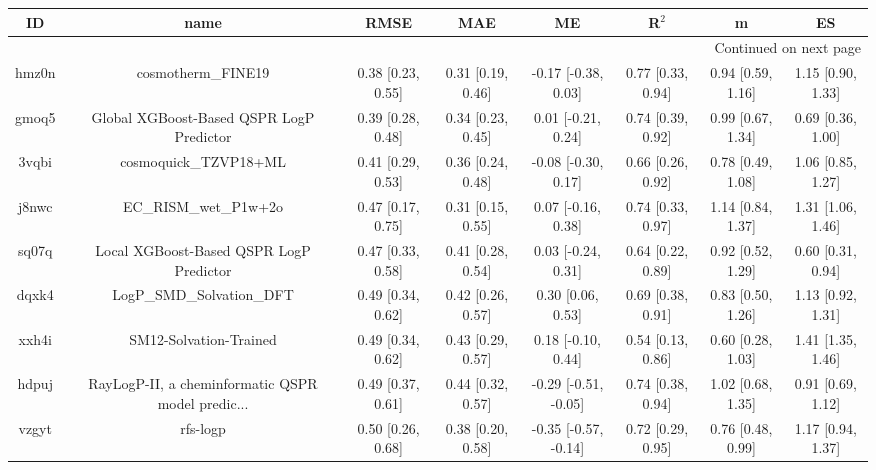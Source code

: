\documentclass{article}
\begin{document}
\begin{center}
\begin{longtable}{|cccccccc|}
\toprule
    ID &                                               name &               RMSE &                MAE &                    ME &              R$^2$ &                    m &                    ES \\
\midrule
\endhead
\midrule
\multicolumn{8}{r}{{Continued on next page}} \\
\midrule
\endfoot

\bottomrule
\endlastfoot
 hmz0n &                                 cosmotherm\_FINE19 &  0.38 [0.23, 0.55] &  0.31 [0.19, 0.46] &   -0.17 [-0.38, 0.03] &  0.77 [0.33, 0.94] &    0.94 [0.59, 1.16] &     1.15 [0.90, 1.33] \\
 gmoq5 &           Global XGBoost-Based QSPR LogP Predictor &  0.39 [0.28, 0.48] &  0.34 [0.23, 0.45] &    0.01 [-0.21, 0.24] &  0.74 [0.39, 0.92] &    0.99 [0.67, 1.34] &     0.69 [0.36, 1.00] \\
 3vqbi &                              cosmoquick\_TZVP18+ML &  0.41 [0.29, 0.53] &  0.36 [0.24, 0.48] &   -0.08 [-0.30, 0.17] &  0.66 [0.26, 0.92] &    0.78 [0.49, 1.08] &     1.06 [0.85, 1.27] \\
 j8nwc &                              EC\_RISM\_wet\_P1w+2o &  0.47 [0.17, 0.75] &  0.31 [0.15, 0.55] &    0.07 [-0.16, 0.38] &  0.74 [0.33, 0.97] &    1.14 [0.84, 1.37] &     1.31 [1.06, 1.46] \\
 sq07q &            Local XGBoost-Based QSPR LogP Predictor &  0.47 [0.33, 0.58] &  0.41 [0.28, 0.54] &    0.03 [-0.24, 0.31] &  0.64 [0.22, 0.89] &    0.92 [0.52, 1.29] &     0.60 [0.31, 0.94] \\
 dqxk4 &                          LogP\_SMD\_Solvation\_DFT &  0.49 [0.34, 0.62] &  0.42 [0.26, 0.57] &     0.30 [0.06, 0.53] &  0.69 [0.38, 0.91] &    0.83 [0.50, 1.26] &     1.13 [0.92, 1.31] \\
 xxh4i &                             SM12-Solvation-Trained &  0.49 [0.34, 0.62] &  0.43 [0.29, 0.57] &    0.18 [-0.10, 0.44] &  0.54 [0.13, 0.86] &    0.60 [0.28, 1.03] &     1.41 [1.35, 1.46] \\
 hdpuj &  RayLogP-II, a cheminformatic QSPR model predic... &  0.49 [0.37, 0.61] &  0.44 [0.32, 0.57] &  -0.29 [-0.51, -0.05] &  0.74 [0.38, 0.94] &    1.02 [0.68, 1.35] &     0.91 [0.69, 1.12] \\
 vzgyt &                                           rfs-logp &  0.50 [0.26, 0.68] &  0.38 [0.20, 0.58] &  -0.35 [-0.57, -0.14] &  0.72 [0.29, 0.95] &    0.76 [0.48, 0.99] &     1.17 [0.94, 1.37] \\

\end{longtable}
\end{center}
\end{document}
